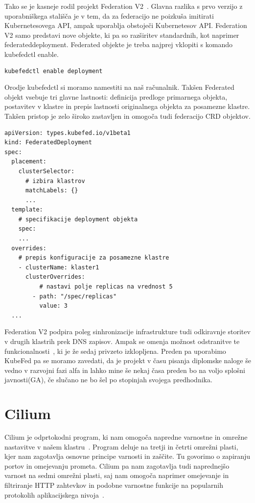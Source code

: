 \documentclass[a4paper, 12pt]{book}
\begin{document}
Tako se je kasneje rodil projekt Federation V2~\cite{Kubernetes-federation-evolution}.
Glavna razlika s prvo verzijo z uporabniškega stališča je v tem, da za federacijo ne poizkuša imitirati Kubernetesovega API, ampak uporablja obstoječi Kubernetesov API. 
Federation V2 samo predstavi nove objekte, ki pa so razširitev standardnih, kot naprimer federateddeployment.
Federated objekte je treba najprej vklopiti s komando kubefedctl enable.
\begin{verbatim}
kubefedctl enable deployment
\end{verbatim}
Orodje kubefedctl si moramo namestiti na naš računalnik.
Takšen Federated objekt vsebuje tri glavne lastnosti: definicija predloge primarnega objekta, postavitev v klastre in prepis lastnosti originalnega objekta za posamezne klastre.
  Takšen pristop je zelo široko zastavljen in omogoča tudi federacijo CRD objektov.
\begin{verbatim}
apiVersion: types.kubefed.io/v1beta1
kind: FederatedDeployment
spec:
  placement:
    clusterSelector:
      # izbira klastrov
      matchLabels: {}
      ... 
  template:
    # specifikacije deployment objekta
    spec:
    ... 
  overrides:
    # prepis konfiguracije za posamezne klastre
    - clusterName: klaster1
      clusterOverrides:
          # nastavi polje replicas na vrednost 5
        - path: "/spec/replicas"
          value: 3
  ... 
\end{verbatim}
  Federation V2 podpira poleg sinhronizacije infrastrukture tudi odkiravnje storitev v drugih klastrih prek DNS zapisov.
Ampak se omenja možnost odstranitve te funkcionalnosti~\cite{remove-service-discovery}, ki je že sedaj privzeto izklopljena.
  Preden pa uporabimo KubeFed pa se moramo zavedati, da je projekt v času pisanja diplomske naloge še vedno v razvojni fazi alfa in lahko mine še nekaj časa preden bo na voljo splošni javnosti(GA), če slučano ne bo šel po stopinjah svojega predhodnika.
\section{Cilium}
Cilium je odprtokodni program, ki nam omogoča napredne varnostne in omrežne nastavitve v našem klastru~\cite{cilium-intro}.
Program deluje na tretji in četrti omrežni plasti, kjer nam zagotavlja osnovne principe varnosti in zaščite.
Tu govorimo o zapiranju portov in omejevanju prometa.
Cilium pa nam zagotavlja tudi naprednejšo varnost na sedmi omrežni plasti, saj nam omogoča naprimer omejevanje in filtriranje HTTP zahtevkov in podobne varnostne funkcije na popularnih protokolih aplikacijskega nivoja~\cite{cilium-intro}.
\end{document}
